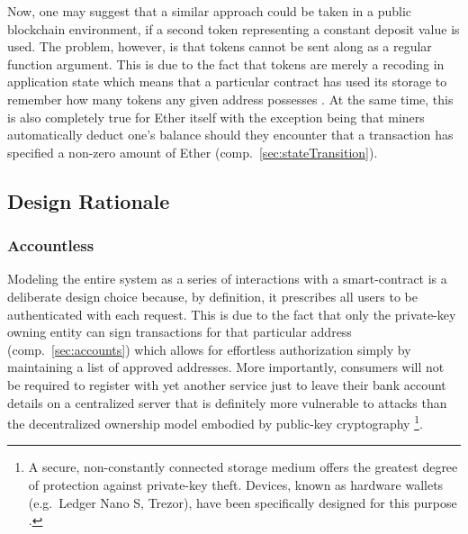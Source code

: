 \begin{description}
	Now, one may suggest that a similar approach could be taken in a public blockchain environment, if a second token representing a constant deposit value is used. The problem, however, is that tokens cannot be sent along as a regular function argument. This is due to the fact that tokens are merely a recoding in application state which means that a particular contract has used its storage to remember how many tokens any given address possesses \cite[pp.~181, 193]{Antonopoulos.2018}. At the same time, this is also completely true for Ether itself with the exception being that miners automatically deduct one's balance should they encounter that a transaction has specified a non-zero amount of Ether (comp.~\ref{sec:stateTransition}).
\end{description}

\subsection{Design Rationale}
\subsubsection{Accountless}
Modeling the entire system as a series of interactions with a smart-contract is a deliberate design choice because, by definition, it prescribes all users to be authenticated with each request. This is due to the fact that only the private-key owning entity can sign transactions for that particular address (comp.~\ref{sec:accounts}) which allows for effortless authorization simply by maintaining a list of approved addresses. More importantly, consumers will not be required to register with yet another service just to leave their bank account details on a centralized server that is definitely more vulnerable to attacks than the decentralized ownership model embodied by public-key cryptography \footnote{A secure, non-constantly connected storage medium offers the greatest degree of protection against private-key theft. Devices, known as hardware wallets (e.g.~Ledger Nano S, Trezor), have been specifically designed for this purpose \cite[p.~15]{nist2018}.}.

